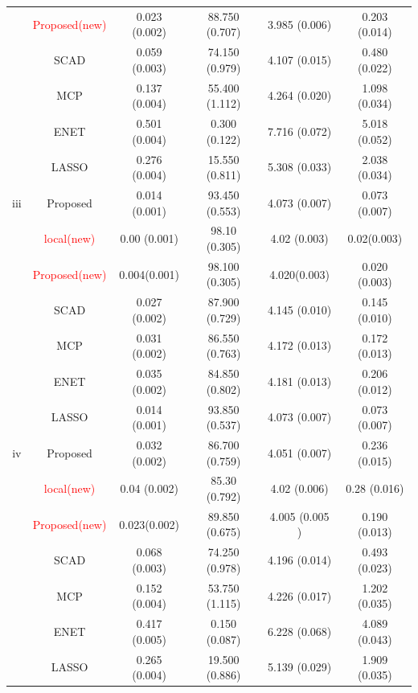 \documentclass[12pt]{article}
\begin{document}
\begin{table}[H]
\begin{tabular}{cc|c|c|c|c}
           & \textcolor{red}{Proposed(new)} & 0.023  (0.002) & 88.750  (0.707) & 3.985  (0.006)  & 0.203 (0.014) \\
           & SCAD                           & 0.059 (0.003)  & 74.150 (0.979)  & 4.107 (0.015)   & 0.480 (0.022) \\
           & MCP                            & 0.137 (0.004)  & 55.400 (1.112)  & 4.264 (0.020)   & 1.098 (0.034) \\
           & ENET                           & 0.501 (0.004)  & 0.300 (0.122)   & 7.716 (0.072)   & 5.018 (0.052) \\
           & LASSO                          & 0.276 (0.004)  & 15.550 (0.811)  & 5.308 (0.033)   & 2.038 (0.034) \\
  \hline
  iii      & Proposed                       & 0.014 (0.001)  & 93.450 (0.553)  & 4.073 (0.007)   & 0.073 (0.007) \\
           & \textcolor{red}{local(new)}    & 0.00  (0.001)  & 98.10  (0.305)  & 4.02  (0.003)   & 0.02(0.003)   \\
           & \textcolor{red}{Proposed(new)} & 0.004(0.001)   & 98.100 (0.305)  & 4.020(0.003)    & 0.020 (0.003) \\
           & SCAD                           & 0.027 (0.002)  & 87.900 (0.729)  & 4.145 (0.010)   & 0.145 (0.010) \\
           & MCP                            & 0.031 (0.002)  & 86.550 (0.763)  & 4.172 (0.013)   & 0.172 (0.013) \\
           & ENET                           & 0.035 (0.002)  & 84.850 (0.802)  & 4.181 (0.013)   & 0.206 (0.012) \\
           & LASSO                          & 0.014 (0.001)  & 93.850 (0.537)  & 4.073 (0.007)   & 0.073 (0.007) \\
  \hline
  iv       & Proposed                       & 0.032 (0.002)  & 86.700 (0.759)  & 4.051 (0.007)   & 0.236 (0.015) \\
           & \textcolor{red}{local(new)}    & 0.04  (0.002)  & 85.30  (0.792)  & 4.02  (0.006)   & 0.28  (0.016) \\
           & \textcolor{red}{Proposed(new)} & 0.023(0.002)   & 89.850 (0.675)  & 4.005  (0.005 ) & 0.190 (0.013) \\
           & SCAD                           & 0.068 (0.003)  & 74.250 (0.978)  & 4.196 (0.014)   & 0.493 (0.023) \\
           & MCP                            & 0.152 (0.004)  & 53.750 (1.115)  & 4.226 (0.017)   & 1.202 (0.035) \\
           & ENET                           & 0.417 (0.005)  & 0.150 (0.087)   & 6.228 (0.068)   & 4.089 (0.043) \\
           & LASSO                          & 0.265 (0.004)  & 19.500 (0.886)  & 5.139 (0.029)   & 1.909 (0.035) \\
  \hline
 \end{tabular}
\end{table}
\end{document}
